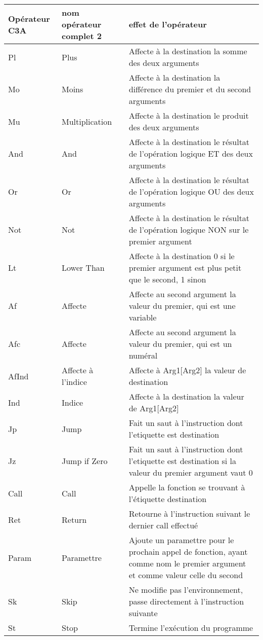 \documentclass{article}
\begin{document}
\begin{tabular}{|p{1.5cm}|p{2cm}|p{7cm}|}
  \hline
  Opérateur C3A & nom opérateur complet 2 & effet de l'opérateur \\
  \hline
  \hline
  Pl & Plus & Affecte à la destination la somme des deux arguments \\  \hline
  Mo & Moins & Affecte à la destination la différence du premier et du second arguments \\  \hline
  Mu & Multiplication & Affecte à la destination le produit des deux arguments \\  \hline
  And & And & Affecte à la destination le résultat de l'opération logique ET des deux arguments \\  \hline
  Or & Or & Affecte à la destination le résultat de l'opération logique OU des deux arguments \\  \hline
  Not & Not & Affecte à la destination le résultat de l'opération logique NON sur le premier argument \\  \hline
  Lt & Lower Than & Affecte à la destination 0 si le premier argument est plus petit que le second, 1 sinon\\  \hline
  Af & Affecte & Affecte au second argument la valeur du premier, qui est une variable\\  \hline
  Afc & Affecte & Affecte au second argument la valeur du premier, qui est un numéral\\  \hline
  AfInd & Affecte à l'indice & Affecte à Arg1[Arg2] la valeur de destination\\  \hline
  Ind & Indice & Affecte à la destination la valeur de Arg1[Arg2]\\  \hline
  Jp & Jump & Fait un saut à l'instruction dont l'etiquette est destination\\  \hline
  Jz & Jump if Zero & Fait un saut à l'instruction dont l'etiquette est destination si la valeur du premier argument vaut 0\\  \hline
  Call & Call & Appelle la fonction se trouvant à l'étiquette destination\\  \hline
  Ret & Return & Retourne à l'instruction suivant le dernier call effectué\\  \hline
  Param & Paramettre & Ajoute un paramettre pour le prochain appel de fonction, ayant comme nom le premier argument et comme valeur celle du second\\  \hline
  Sk & Skip & Ne modifie pas l'environnement, passe directement à l'instruction suivante\\  \hline
  St & Stop & Termine l'exécution du programme\\  \hline
\end{tabular}
\end{document}
